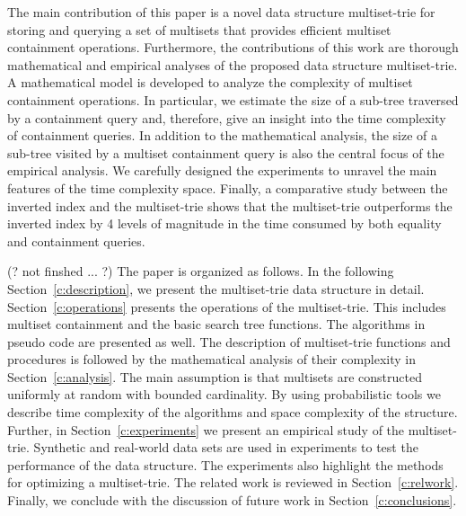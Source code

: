 % 
%
The main contribution of this paper is a novel data structure multiset-trie for storing and querying a set of multisets that provides efficient multiset containment operations. Furthermore, the contributions of this work are thorough mathematical and empirical analyses of the proposed data structure multiset-trie. 
%
A mathematical model is developed to analyze the complexity of multiset containment operations. In particular, we estimate the size of a sub-tree traversed by a containment query and, therefore, give an insight into the time complexity of containment queries.  In addition to the mathematical analysis, the size of a sub-tree visited by a multiset containment query is also the central focus of the empirical analysis. We carefully designed the experiments to unravel the main features of the time complexity space. 
%
Finally, a comparative study between the inverted index and the multiset-trie shows that the multiset-trie outperforms the inverted index by 4 levels of magnitude in the time consumed by both equality and containment queries.
%
%
%
%

(? not finshed ... ?)
The paper is organized as follows. In the following Section~\ref{c:description}, we present the multiset-trie data structure in detail.
%
Section~\ref{c:operations} presents the operations of the multiset-trie. This includes multiset containment and the basic search tree functions. The algorithms in pseudo code are presented as well. 
%
The description of multiset-trie functions and procedures is followed by the mathematical analysis of their complexity in Section~\ref{c:analysis}. The main assumption is that multisets are constructed uniformly at random with bounded cardinality. By using probabilistic tools we describe time complexity of the algorithms and space complexity of the structure.
%
Further, in Section~\ref{c:experiments} we present an empirical study of the multiset-trie. Synthetic and real-world data sets are used in experiments to test the performance of the data structure. The experiments also highlight the methods for optimizing a multiset-trie.
%
The related work is reviewed in Section~\ref{c:relwork}. 
%
Finally, we conclude with the discussion of future work in Section~\ref{c:conclusions}.
%